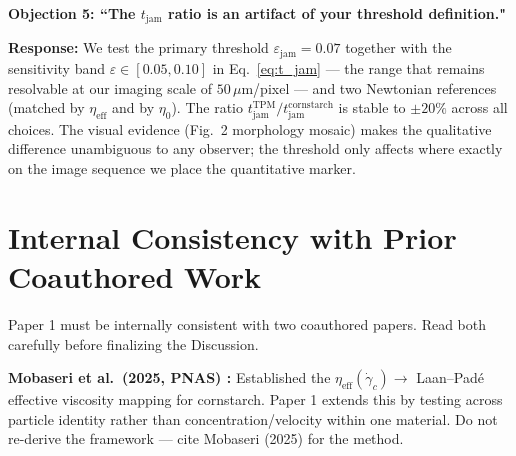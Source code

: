 \documentclass[11pt,letterpaper]{article}
\newcommand{\tjam}{t_{\mathrm{jam}}}
\newcommand{\etaeff}{\eta_{\mathrm{eff}}}
\newcommand{\gamcrit}{\dot{\gamma}_c}
\begin{document}
\begin{reviewbox}
\textbf{Objection 5: ``The $\tjam$ ratio is an artifact
of your threshold definition."}

\textbf{Response:}
We test the primary threshold $\varepsilon_\mathrm{jam} = 0.07$ together with the
sensitivity band $\varepsilon \in [0.05, 0.10]$ in
Eq.~\eqref{eq:t_jam} --- the range that remains resolvable at our imaging
scale of $50\,\mu$m/pixel --- and two Newtonian references (matched by $\etaeff$ and
by $\eta_0$). The ratio
$\tjam^\mathrm{TPM}/\tjam^\mathrm{cornstarch}$ is stable to $\pm 20\%$
across all choices. The visual evidence (Fig.~2 morphology mosaic) makes the
qualitative difference unambiguous to any observer; the threshold only
affects where exactly on the image sequence we place the quantitative marker.
\end{reviewbox}

\section{Internal Consistency with Prior Coauthored Work}

\begin{cautionbox}
Paper 1 must be internally consistent with two coauthored papers. Read both
carefully before finalizing the Discussion.
\end{cautionbox}

\textbf{Mobaseri et al.\ (2025, PNAS) \cite{Mobaseri2025}:}
Established the $\etaeff(\gamcrit) \to$ Laan--Padé effective viscosity
mapping for cornstarch. Paper 1 extends this by testing across particle
identity rather than concentration/velocity within one material. Do not
re-derive the framework --- cite Mobaseri (2025) for the method.
\end{document}
